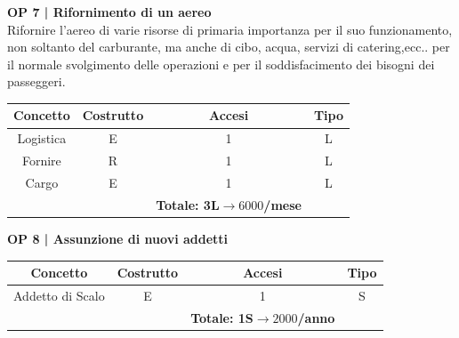 \vspace{.6cm}



\textbf{\small OP 7 | Rifornimento di un aereo}\\

\textsf{\small Rifornire l'aereo di varie risorse di primaria importanza per il suo funzionamento, non soltanto del carburante, ma anche di cibo, acqua, servizi di catering,ecc.. per il normale svolgimento delle operazioni e per il soddisfacimento dei bisogni dei passeggeri.}\break

\begin{tabular}{ c c c c}
	\hline
	\rowcolor{airforceblue}
	\textbf{\color{white}Concetto} & \textbf{\color{white}Costrutto} & \textbf{\color{white}Accesi} & \textbf{\color{white}Tipo}\\
	\hline
	\textsf{\small Logistica} & \textsf{\small E} & \textsf{\small 1} &  \textsf{\small L}\\
	\hline
	\textsf{\small Fornire} & \textsf{\small R} & \textsf{\small 1} &  \textsf{\small L}\\
	\hline
	\textsf{\small Cargo} & \textsf{\small E} & \textsf{\small 1} &  \textsf{\small L}\\
	\hline
	\rowcolor{airforceblue}
	\textsf{\small } & \textsf{\small } & \textbf{\color{white}Totale: 3L$\rightarrow 6000$/mese } \textsf{\small } & \textsf{\small }\\ %
	\hline
\end{tabular}

\vspace{.6cm}


\textbf{\small OP 8 | Assunzione di nuovi addetti}\\

\begin{tabular}{ c c c c}
	\hline
	\rowcolor{airforceblue}
	\textbf{\color{white}Concetto} & \textbf{\color{white}Costrutto} & \textbf{\color{white}Accesi} & \textbf{\color{white}Tipo}\\
	\hline
	\textsf{\small Addetto di Scalo} & \textsf{\small E} & \textsf{\small 1} &  \textsf{\small S}\\
	\hline
	\rowcolor{airforceblue}
	\textsf{\small } & \textsf{\small } & \textbf{\color{white}Totale: 1S$\rightarrow 2000$/anno } \textsf{\small } & \textsf{\small }\\ %
	\hline
\end{tabular}

